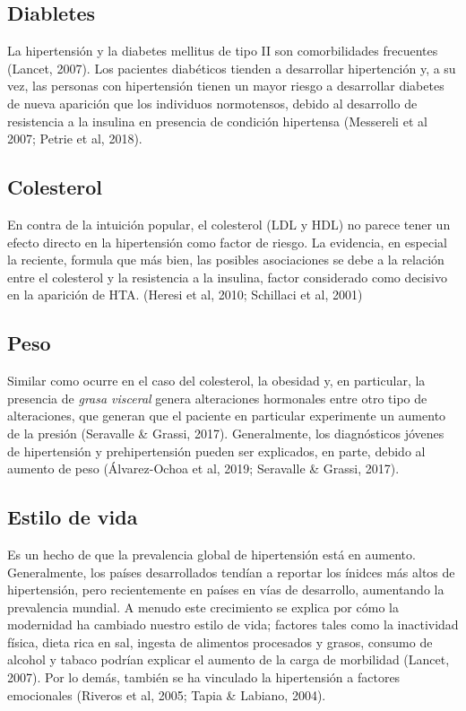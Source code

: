 \documentclass{aa}
\begin{document}
\subsection{Diabletes}

La hipertensión y la diabetes mellitus de tipo II son comorbilidades frecuentes (Lancet, 2007). Los pacientes diabéticos tienden a desarrollar hipertención y, a su vez, las personas con hipertensión tienen un mayor riesgo a desarrollar diabetes de nueva aparición que los individuos normotensos, debido al desarrollo de resistencia a la insulina en presencia de condición hipertensa (Messereli et al 2007; Petrie et al, 2018).

\subsection{Colesterol}

En contra de la intuición popular, el colesterol (LDL y HDL) no parece tener un efecto directo en la hipertensión como factor de riesgo. La evidencia, en especial la reciente, formula que más bien, las posibles asociaciones se debe a la relación entre el colesterol y la resistencia a la insulina, factor considerado como decisivo en la aparición de HTA. (Heresi et al, 2010; Schillaci et al, 2001)

\subsection{Peso}

Similar como ocurre en el caso del colesterol, la obesidad y, en particular, la presencia de \textit{grasa visceral} genera alteraciones hormonales entre otro tipo de alteraciones, que generan que el paciente en particular experimente un aumento de la presión (Seravalle & Grassi, 2017). Generalmente, los diagnósticos jóvenes de hipertensión y prehipertensión pueden ser explicados, en parte, debido al aumento de peso (Álvarez-Ochoa et al, 2019; Seravalle & Grassi, 2017).

\subsection{Estilo de vida}

Es un hecho de que la prevalencia global de hipertensión está en aumento. Generalmente, los países desarrollados tendían a reportar los ínidces más altos de hipertensión, pero recientemente en países en vías de desarrollo, aumentando la prevalencia mundial. A menudo este crecimiento se explica por cómo la modernidad ha cambiado nuestro estilo de vida; factores tales como la inactividad física, dieta rica en sal, ingesta de alimentos procesados y grasos, consumo de alcohol y tabaco podrían explicar el aumento de la carga de morbilidad (Lancet, 2007). Por lo demás, también se ha vinculado la hipertensión a factores emocionales (Riveros et al, 2005; Tapia & Labiano, 2004).
\end{document}

